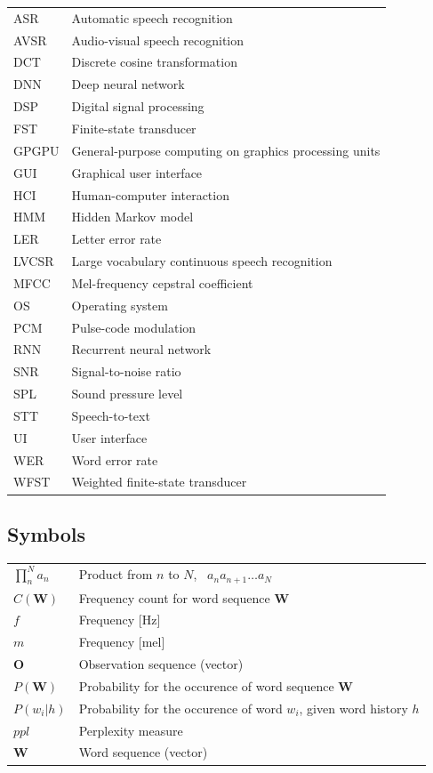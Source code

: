 \documentclass[english, 12pt, a4paper, pdftex, elec, utf8]{aaltothesis}
\begin{document}
{\setlength{\tabcolsep}{6mm}
\begin{tabular}{ll}
ASR         	 & Automatic speech recognition \\
AVSR			& Audio-visual speech recognition \\
DCT				& Discrete cosine transformation \\
DNN				& Deep neural network \\
DSP				& Digital signal processing \\
FST				& Finite-state transducer \\
GPGPU 		  	& General-purpose computing on graphics processing units \\
GUI      		  & Graphical user interface \\
HCI  			  & Human-computer interaction \\
HMM   			& Hidden Markov model \\
LER				 & Letter error rate \\
LVCSR 		   & Large vocabulary continuous speech recognition \\
MFCC  		   & Mel-frequency cepstral coefficient \\
OS				& Operating system \\
PCM  		    & Pulse-code modulation \\
RNN				& Recurrent neural network \\
SNR				 & Signal-to-noise ratio \\
SPL				 & Sound pressure level \\
STT					& Speech-to-text \\
UI	       		   & User interface \\
WER    			& Word error rate \\
WFST		  & Weighted finite-state transducer
\end{tabular}}

\subsection*{Symbols}

{\setlength{\tabcolsep}{6mm}
\begin{tabular}{ll}
	$\displaystyle \prod_{n}^{N} a_{n} $ & Product from $n$ to $N$, \ $a_n a_{n+1} \dots a_{N}$ \\
	$C(\bm{W})$			& Frequency count for word sequence $\bm{W}$ \\
	$f$              	 & Frequency [Hz] \\
	$m$					& Frequency [mel] \\
	$\bm{O}$		& Observation sequence (vector) \\
	$P(\bm{W})$   & Probability for the occurence of word sequence $\bm{W}$ \\
	$P(w_i|h)$       & Probability for the occurence of word $w_i$, given word history $h$ \\
	$ppl$				& Perplexity measure \\
	$\bm{W}$		& Word sequence (vector)
\end{tabular}}
\end{document}
